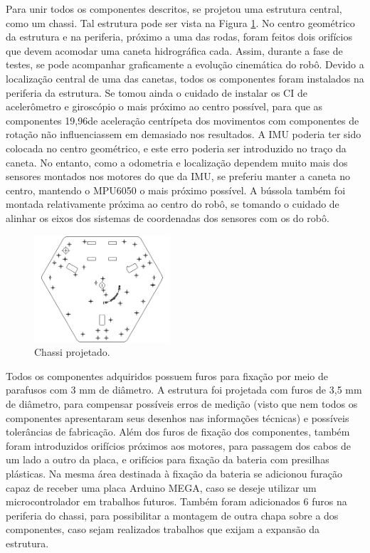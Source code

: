 Para unir todos os componentes descritos, se projetou uma estrutura central, como um chassi. Tal estrutura pode ser vista na Figura \ref{fig:chassi}. No centro geométrico da estrutura e na periferia, próximo a uma das rodas, foram feitos dois orifícios que devem acomodar uma caneta hidrográfica cada. Assim, durante a fase de testes, se pode acompanhar graficamente a evolução cinemática do robô. Devido a localização central de uma das canetas, todos os componentes foram instalados na periferia da estrutura. Se tomou ainda o cuidado de instalar os CI de acelerômetro e giroscópio o mais próximo ao centro possível, para que as componentes 19,96de aceleração centrípeta dos movimentos com componentes de rotação não influenciassem em demasiado nos resultados. A IMU poderia ter sido colocada no centro geométrico, e este erro poderia ser introduzido no traço da caneta. No entanto, como a odometria e localização dependem muito mais dos sensores montados nos motores do que da IMU, se preferiu manter a caneta no centro, mantendo o MPU6050 o mais próximo possível. A bússola também foi montada relativamente próxima ao centro do robô, se tomando o cuidado de alinhar os eixos dos sistemas de coordenadas dos sensores com os do robô.

\begin{figure}[h]
  \centering
  \includegraphics[width = 0.45\textwidth]{imagens/chassidxf}
  \caption{Chassi projetado.}
  \label{fig:chassi}
\end{figure}

Todos os componentes adquiridos possuem furos para fixação por meio de parafusos com 3 mm de diâmetro. A estrutura foi projetada com furos de 3,5 mm de diâmetro, para compensar possíveis erros de medição (visto que nem todos os componentes apresentaram seus desenhos nas informações técnicas) e possíveis tolerâncias de fabricação. Além dos furos de fixação dos componentes, também foram introduzidos orifícios próximos aos motores, para passagem dos cabos de um lado a outro da placa, e orifícios para fixação da bateria com presilhas plásticas. Na mesma área destinada à fixação da bateria se adicionou furação capaz de receber uma placa Arduino MEGA, caso se deseje utilizar um microcontrolador em trabalhos futuros. Também foram adicionados 6 furos na periferia do chassi, para possibilitar a montagem de outra chapa sobre a dos componentes, caso sejam realizados trabalhos que exijam a expansão da estrutura.

